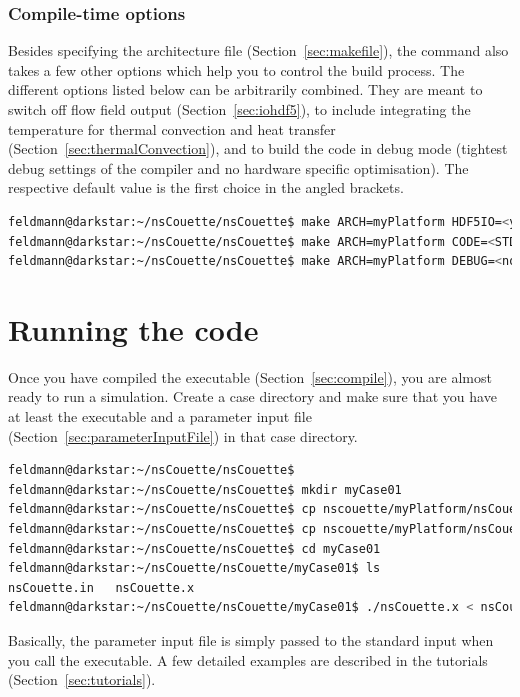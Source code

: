 \documentclass[a4paper, 11pt, DIV=11]{scrartcl}
\begin{document}
\subsubsection{Compile-time options}
\label{sec:compileTimeOptions}

Besides specifying the architecture file (Section~\ref{sec:makefile}),
the  command also takes a few other options which help you to
control the build process. The different options listed below can be
arbitrarily combined. They are meant to switch off \hdf flow field output
(Section~\ref{sec:iohdf5}), to include integrating the temperature for
thermal convection and heat transfer (Section~\ref{sec:thermalConvection}),
and to build the code in debug mode (\ie tightest debug settings of the
compiler and no hardware specific optimisation). The respective default
value is the first choice in the angled brackets.
\begin{lstlisting}[language=bash]
feldmann@darkstar:~/nsCouette/nsCouette$ make ARCH=myPlatform HDF5IO=<yes|no>
feldmann@darkstar:~/nsCouette/nsCouette$ make ARCH=myPlatform CODE=<STD_CODE|TE_CODE>
feldmann@darkstar:~/nsCouette/nsCouette$ make ARCH=myPlatform DEBUG=<no|yes>
\end{lstlisting}



\section{Running the code}
\label{sec:runningTheCode}

Once you have compiled the executable (Section~\ref{sec:compile}), you
are almost ready to run a simulation. Create a case directory and make
sure that you have at least the executable and a parameter input file
(Section~\ref{sec:parameterInputFile}) in that case directory.
\begin{lstlisting}[language=bash]
feldmann@darkstar:~/nsCouette/nsCouette$
feldmann@darkstar:~/nsCouette/nsCouette$ mkdir myCase01
feldmann@darkstar:~/nsCouette/nsCouette$ cp nscouette/myPlatform/nsCouette.x  myCase01/.
feldmann@darkstar:~/nsCouette/nsCouette$ cp nscouette/myPlatform/nsCouette.in myCase01/.
feldmann@darkstar:~/nsCouette/nsCouette$ cd myCase01
feldmann@darkstar:~/nsCouette/nsCouette/myCase01$ ls
nsCouette.in   nsCouette.x
feldmann@darkstar:~/nsCouette/nsCouette/myCase01$ ./nsCouette.x < nsCouette.in
\end{lstlisting}
Basically, the parameter input file is simply passed to the standard input
when you call the executable. A few detailed examples are described in the
tutorials (Section~\ref{sec:tutorials}).
\end{document}
